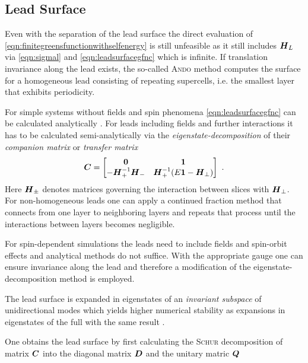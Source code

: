 \subsection{Lead Surface \cgfncs{}}
Even with the separation of the lead surface \gfnc{} the direct evaluation of \cref{eqn:finitegreensfunctionwithselfenergy} is still unfeasible as it still includes $\boldsymbol{H}_L$ via \cref{eqn:sigmal} and \cref{eqn:leadsurfacegfnc} which is infinite.
If translation invariance along the lead exists, the so-called \textsc{Ando} method \cite{PhysRevB.44.8017} computes the surface \gfnc{} for a homogeneous lead consisting of repeating supercells, i.e. the smallest layer that exhibits periodicity.\par
For simple systems without fields and spin phenomena \cref{eqn:leadsurfacegfnc} can be calculated analytically \cite{Datta1997}. For leads including fields and further interactions it has to be calculated semi-analytically via the \emph{eigenstate-decomposition} of their \emph{companion matrix} \cite{PhysRevB.25.3975} or \emph{transfer matrix} \cite{PhysRevB.55.5266} \cite{PhysRevB.66.205319}
\begin{align}
  \boldsymbol{C} =
  \begin{bmatrix}
  \boldsymbol{0}  &\boldsymbol{1} \\
  -\boldsymbol{H}_{+}^{-1}\boldsymbol{H}_{-} &\boldsymbol{H}_{+}^{-1} (E\boldsymbol{1} - \boldsymbol{H}_{\perp})
  \end{bmatrix}\ .
  \label{eqn:companionmatrix}
\end{align}
Here $\boldsymbol{H}_{\pm}$ denotes matrices governing the interaction between slices with \hamil{} $\boldsymbol{H}_{\perp}$.
For non-homogeneous leads one can apply a continued fraction method \cite{Velev2004} that connects \gfncs{} from one layer to neighboring layers and repeats that process until the interactions between layers becomes negligible.\par
For spin-dependent simulations the leads need to include fields and spin-orbit effects and analytical methods do not suffice. With the appropriate gauge one can ensure invariance along the lead and therefore a modification of the eigenstate-decomposition method is employed.\par
The lead surface \gfnc{} is expanded in eigenstates of an \emph{invariant subspace} of unidirectional modes which yields higher numerical stability as expansions in eigenstates of the full \hamil{} with the same result \cite{Wimmer2009JComPhys}.\par
One obtains the lead surface \gfnc{} by first calculating the \textsc{Schur} decomposition of matrix $\boldsymbol{C}$ into the diagonal matrix $\boldsymbol{D}$ and the unitary matric $\boldsymbol{Q}$
